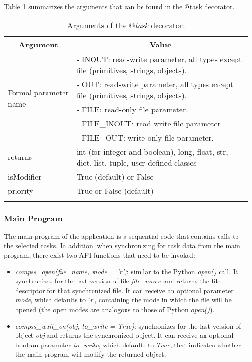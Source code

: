 Table \ref{tab:task_decorator_arguments} summarizes the arguments that can be found in the $@$task decorator.
\bgroup
  \def\arraystretch{1.5}%
  \begin{longtable}{| p{} | p{} |}
    \hline
    \multicolumn{1}{|c|}{{\bf Argument }}    &  \multicolumn{1}{c|}{{\bf Value }}\\
    \hline
    \multirow{5}{*}{Formal parameter name}  &  - INOUT: read-write parameter, all types except file (primitives, strings, objects). \\
    & - OUT: read-write parameter, all types except file (primitives, strings, objects). \\
    & - FILE: read-only file parameter. \\
    & - FILE\_INOUT: read-write file parameter. \\
    & - FILE\_OUT: write-only file parameter. \\
    \hline
    returns & int (for integer and boolean), long, float, str, dict, list, tuple, user-defined classes \\
    \hline
    isModifier &  True (default) or False \\
    \hline
    priority  & True or False (default) \\
    \hline
    \caption{Arguments of the {\it $@$task} decorator.}
    \label{tab:task_decorator_arguments}
  \end{longtable}
\egroup


\subsubsection{Main Program}
The main program of the application is a sequential code that contains calls to the selected tasks. 
In addition, when synchronizing for task data from the main program, 
there exist two API functions that need to be invoked:

\begin{itemize}
 \item {\it compss\_open(file\_name, mode = 'r')}: similar to the Python {\it open()} call. It synchronizes
       for the last version of file {\it file\_name} and returns the file descriptor for that synchronized
       file. It can receive an optional parameter {\it mode}, which defaults to '{\it r}', containing the
       mode in which the file will be opened (the open modes are analogous to those of
       Python {\it open()}).
 \item {\it compss\_wait\_on(obj, to\_write = True)}: synchronizes for the last version of object {\it obj}
       and returns the synchronized object. It can receive an optional boolean parameter
       {\it to\_write}, which defaults to {\it True}, that indicates whether the main program will modify the
       returned object.
\end{itemize}

